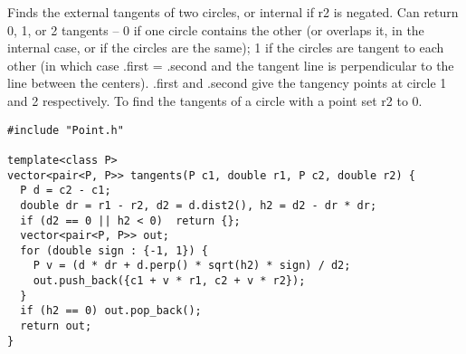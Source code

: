 Finds the external tangents of two circles, or internal if r2 is negated.
Can return 0, 1, or 2 tangents -- 0 if one circle contains the other (or overlaps it, in the internal case, or if the circles are the same);
1 if the circles are tangent to each other (in which case .first = .second and the tangent line is perpendicular to the line between the centers).
.first and .second give the tangency points at circle 1 and 2 respectively.
To find the tangents of a circle with a point set r2 to 0.
\begin{verbatim}
#include "Point.h"

template<class P>
vector<pair<P, P>> tangents(P c1, double r1, P c2, double r2) {
  P d = c2 - c1;
  double dr = r1 - r2, d2 = d.dist2(), h2 = d2 - dr * dr;
  if (d2 == 0 || h2 < 0)  return {};
  vector<pair<P, P>> out;
  for (double sign : {-1, 1}) {
    P v = (d * dr + d.perp() * sqrt(h2) * sign) / d2;
    out.push_back({c1 + v * r1, c2 + v * r2});
  }
  if (h2 == 0) out.pop_back();
  return out;
}
\end{verbatim}